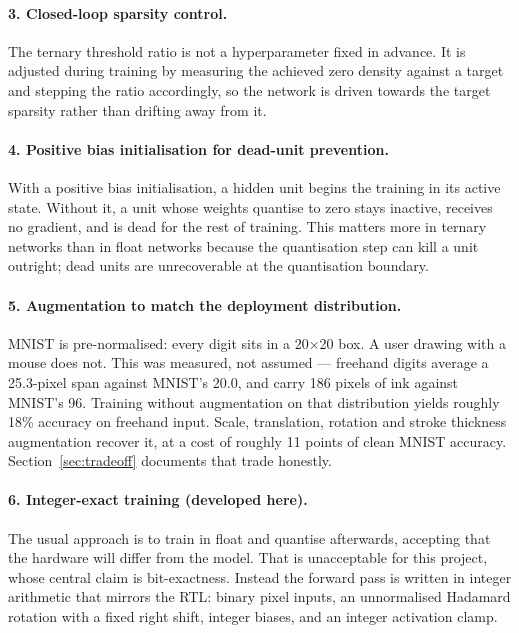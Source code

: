 \documentclass[11pt,a4paper]{article}
\begin{document}
\paragraph{3. Closed-loop sparsity control.}
The ternary threshold ratio is not a hyperparameter fixed in advance. It is
adjusted during training by measuring the achieved zero density against a target
and stepping the ratio accordingly, so the network is driven towards the
target sparsity rather than drifting away from it.

\paragraph{4. Positive bias initialisation for dead-unit prevention.}
With a positive bias initialisation, a hidden unit begins the training in its
active state. Without it, a unit whose weights quantise to zero stays inactive,
receives no gradient, and is dead for the rest of training. This matters more in
ternary networks than in float networks because the quantisation step can kill a
unit outright; dead units are unrecoverable at the quantisation boundary.

\paragraph{5. Augmentation to match the deployment distribution.}
MNIST is pre-normalised: every digit sits in a 20$\times$20 box. A user drawing
with a mouse does not. This was measured, not assumed --- freehand digits
average a 25.3-pixel span against MNIST's 20.0, and carry 186 pixels of ink
against MNIST's 96. Training without augmentation on that distribution yields
roughly 18\% accuracy on freehand input. Scale, translation, rotation and stroke
thickness augmentation recover it, at a cost of roughly 11 points of clean
MNIST accuracy. Section~\ref{sec:tradeoff} documents that trade honestly.

\paragraph{6. Integer-exact training (developed here).}
The usual approach is to train in float and quantise afterwards, accepting that
the hardware will differ from the model. That is unacceptable for this project,
whose central claim is bit-exactness. Instead the forward pass is written in
integer arithmetic that mirrors the RTL: binary pixel inputs, an unnormalised
Hadamard rotation with a fixed right shift, integer biases, and an integer
activation clamp.
\end{document}
